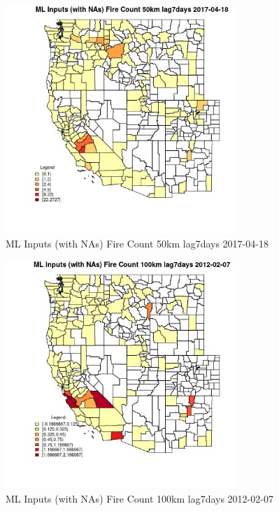 \begin{figure} 
\centering  
\includegraphics[width=0.77\textwidth]{Code_Outputs/Report_ML_input_PM25_Step4_part_f_de_duplicated_aveswNAs_CountyFire_Count_50km_lag7daysMean2017-04-18.jpg} 
\caption{\label{fig:Report_ML_input_PM25_Step4_part_f_de_duplicated_aveswNAsCountyFire_Count_50km_lag7daysMean2017-04-18}ML Inputs (with NAs) Fire Count 50km lag7days 2017-04-18} 
\end{figure} 
 

\clearpage 

\begin{figure} 
\centering  
\includegraphics[width=0.77\textwidth]{Code_Outputs/Report_ML_input_PM25_Step4_part_f_de_duplicated_aveswNAs_CountyFire_Count_100km_lag7daysMean2012-02-07.jpg} 
\caption{\label{fig:Report_ML_input_PM25_Step4_part_f_de_duplicated_aveswNAsCountyFire_Count_100km_lag7daysMean2012-02-07}ML Inputs (with NAs) Fire Count 100km lag7days 2012-02-07} 
\end{figure} 
 

